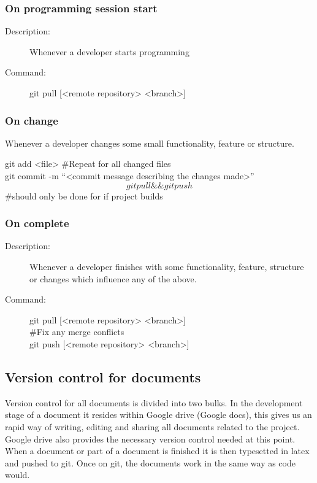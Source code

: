 \subsubsection{On programming session start}
\begin{description}
\item[Description:] Whenever a developer starts programming
\item[Command:] git pull [<remote repository> <branch>]
\end{description}

\subsubsection{On change}
\begin{description}[style=multiline]
\item[Description:] Whenever a developer changes some small functionality, feature or structure.
\item[Command:] git add <file> \#Repeat for all changed files \\ git commit -m “<commit message describing the changes made>” \\  \[git pull \&\& git push\] \#should only be done for if project builds
\end{description}

\subsubsection{On complete}
\begin{description}
\item[Description:]  Whenever a developer finishes with some functionality, feature,  structure or changes which influence 				any of the above.
\item[Command:]  git pull [<remote repository> <branch>] \\  \#Fix any merge conflicts \\ git push [<remote repository> <branch>]
\end{description}

\subsection{Version control for documents}
Version control for all documents is divided into two bulks. In the development stage of a document it resides within Google drive (Google docs), this gives us an rapid way of writing, editing and sharing all documents related to the project. Google drive also provides the necessary version control needed at this point. When a document or part of a document is finished it is then typesetted in latex and pushed to git. Once on git, the documents work in the same way as code would.  


